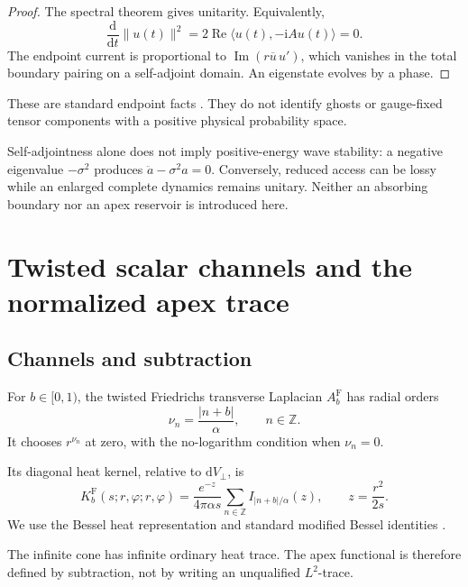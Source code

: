 \documentclass[11pt,a4paper]{article}
\newcommand{\ZZ}{\mathbb Z}
\newcommand{\dd}{\mathrm d}
\newcommand{\ii}{\mathrm i}
\newcommand{\Fr}{\mathrm F}
\newcommand{\abs}[1]{\lvert#1\rvert}
\newcommand{\norm}[1]{\lVert#1\rVert}
\newcommand{\pair}[2]{\langle#1,#2\rangle}
\theoremstyle{plain}
\theoremstyle{definition}
\theoremstyle{remark}
\numberwithin{equation}{section}
\begin{document}
\begin{proof}
The spectral theorem gives unitarity. Equivalently,
\[
 \frac{\dd}{\dd t}\norm{u(t)}^2
 =2\operatorname{Re}\pair{u(t)}{-\ii Au(t)}=0.
\]
The endpoint current is proportional to
\(\operatorname{Im}(r\overline u\,u')\), which vanishes in the
total boundary pairing on a self-adjoint domain.
An eigenstate evolves by a phase.
\end{proof}

These are standard endpoint facts
\cite{DerezinskiRichard,KayStuder}.
They do not identify ghosts or gauge-fixed tensor components
with a positive physical probability space.

Self-adjointness alone does not imply positive-energy wave
stability: a negative eigenvalue \(-\sigma^2\) produces
\(\ddot a-\sigma^2a=0\). Conversely, reduced access can be lossy
while an enlarged complete dynamics remains unitary.
Neither an absorbing boundary nor an apex reservoir is introduced
here.

\section{Twisted scalar channels and the normalized apex trace}
\label{sec:heat}

\subsection{Channels and subtraction}

For \(b\in[0,1)\), the twisted Friedrichs transverse Laplacian
\(A_b^\Fr\) has radial orders
\[
 \nu_n=\frac{\abs{n+b}}{\alpha},\qquad n\in\ZZ.
\]
It chooses \(r^{\nu_n}\) at zero, with the no-logarithm condition
when \(\nu_n=0\).

Its diagonal heat kernel, relative to \(\dd V_\perp\), is
\begin{equation}
 K_b^\Fr(s;r,\varphi;r,\varphi)
 =\frac{e^{-z}}{4\pi\alpha s}
   \sum_{n\in\ZZ}I_{\abs{n+b}/\alpha}(z),
 \qquad z=\frac{r^2}{2s}.
 \label{eq:kernel}
\end{equation}
We use the Bessel heat representation and standard modified
Bessel identities \cite{DLMF,DerezinskiRichard}.

The infinite cone has infinite ordinary heat trace. The apex
functional is therefore defined by subtraction, not by writing an
unqualified \(L^2\)-trace.
\end{document}
